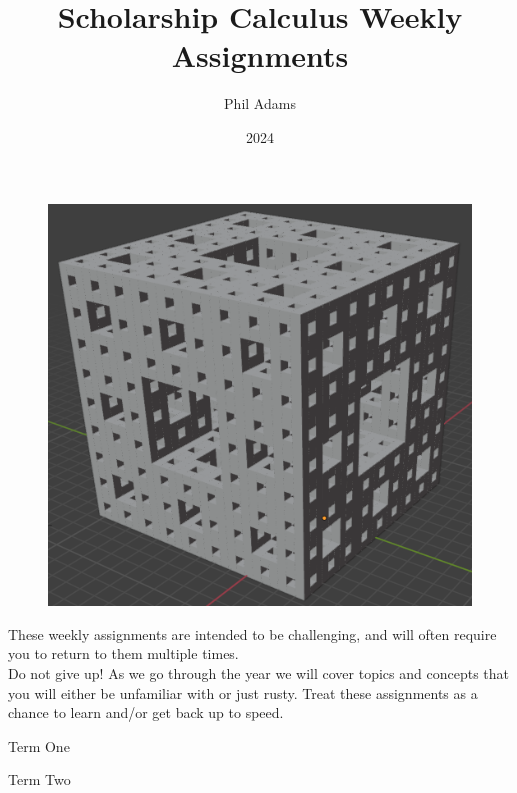 \documentclass[12pt, letterpaper]{article}
\title{Scholarship Calculus Weekly Assignments}
\author{Phil Adams}
\date{2024}
\begin{document}
\maketitle

\begin{figure}[H]
    \centering
    \includegraphics[width=0.5\linewidth]{images/menger.png}
\end{figure}

These weekly assignments are intended to be challenging, and will often require you to return to them multiple times.\\

Do not give up! As we go through the year we will cover topics and concepts that you will either be unfamiliar with or just rusty. Treat these assignments as a chance to learn and/or get back up to speed.

\pagebreak
\begin{center}
    \huge
    Term One
    \normalsize
\end{center}
\restoregeometry

\pagebreak

\pagebreak

\pagebreak

\pagebreak

\pagebreak

\pagebreak

\pagebreak

\pagebreak

\pagebreak


\pagebreak
\begin{center}
    \huge
    Term Two
    \normalsize
\end{center}
\restoregeometry

\pagebreak

\pagebreak

\pagebreak

\pagebreak

\pagebreak

\pagebreak

\pagebreak

\pagebreak
\end{document}
